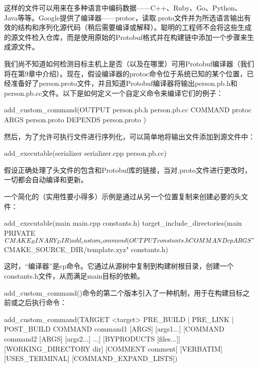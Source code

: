 这样的文件可以用来在多种语言中编码数据——C++、Ruby、Go、Python、Java等等。Google提供了编译器——protoc，读取.proto文件并为所选语言输出有效的结构和序列化源代码（稍后需要编译或解释）。聪明的工程师不会将这些生成的源文件检入仓库，而是使用原始的Protobuf格式并在构建链中添加一个步骤来生成源文件。

我们尚不知道如何检测目标主机上是否（以及在哪里）可用Protobuf编译器（我们将在第9章中介绍）。现在，假设编译器的protoc命令位于系统已知的某个位置，已经准备好了person.proto文件，并且知道Protobuf编译器将输出person.pb.h和person.pb.cc文件。以下是如何定义一个自定义命令来编译它们的例子：

\begin{cmake}
add_custom_command(OUTPUT person.pb.h person.pb.cc
        COMMAND protoc ARGS person.proto
        DEPENDS person.proto
)
\end{cmake}

然后，为了允许可执行文件进行序列化，可以简单地将输出文件添加到源文件中：

\begin{cmake}
add_executable(serializer serializer.cpp person.pb.cc)
\end{cmake}

假设正确处理了头文件的包含和Protobuf库的链接，当对.proto文件进行更改时，一切都会自动编译和更新。

一个简化的（实用性要小得多）示例是通过从另一个位置复制来创建必要的头文件：


\begin{cmake}
add_executable(main main.cpp constants.h)
target_include_directories(main PRIVATE ${CMAKE_BINARY_DIR})
add_custom_command(OUTPUT constants.h COMMAND cp
                   ARGS "${CMAKE_SOURCE_DIR}/template.xyz" constants.h)
\end{cmake}

这时，“编译器”是cp命令。它通过从源树中复制到构建树根目录，创建一个constants.h文件，从而满足main目标的依赖。


add\_custom\_command()命令的第二个版本引入了一种机制，用于在构建目标之前或之后执行命令：

\begin{cmake}
add_custom_command(TARGET <target>
                   PRE_BUILD | PRE_LINK | POST_BUILD
                   COMMAND command1 [ARGS] [args1...]
                   [COMMAND command2 [ARGS] [args2...] ...]
                   [BYPRODUCTS [files...]]
                   [WORKING_DIRECTORY dir]
                   [COMMENT comment]
                   [VERBATIM] [USES_TERMINAL]
                   [COMMAND_EXPAND_LISTS])
\end{cmake}

